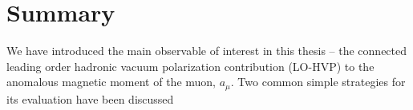 



\section{Summary}
\label{sec:2pt:summary}


We have introduced the main observable of interest in this thesis -- the connected leading order hadronic vacuum polarization contribution (LO-HVP) to the anomalous magnetic moment of the muon, $a_{\mu}$.
Two common simple strategies for its evaluation have been discussed

